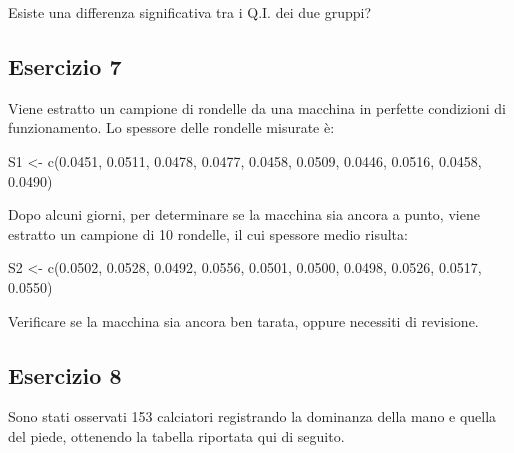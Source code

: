 \documentclass[a4paper,12pt,oneside]{book}
\newenvironment{Shaded}{\begin{snugshade}}{\end{snugshade}}
\newcommand{\FloatTok}[1]{#1}
\newcommand{\OtherTok}[1]{#1}
\newcommand{\FunctionTok}[1]{#1}
\newcommand{\NormalTok}[1]{#1}
\begin{document}
Esiste una differenza significativa tra i Q.I. dei due gruppi?

\hypertarget{esercizio-7-1}{%
\subsection{Esercizio 7}\label{esercizio-7-1}}

Viene estratto un campione di rondelle da una macchina in perfette condizioni di funzionamento. Lo spessore delle rondelle misurate è:

\begin{Shaded}
\begin{Highlighting}[]
\NormalTok{S1 }\OtherTok{\textless{}{-}} \FunctionTok{c}\NormalTok{(}\FloatTok{0.0451}\NormalTok{, }\FloatTok{0.0511}\NormalTok{, }\FloatTok{0.0478}\NormalTok{, }\FloatTok{0.0477}\NormalTok{, }\FloatTok{0.0458}\NormalTok{, }\FloatTok{0.0509}\NormalTok{, }\FloatTok{0.0446}\NormalTok{,}
        \FloatTok{0.0516}\NormalTok{, }\FloatTok{0.0458}\NormalTok{, }\FloatTok{0.0490}\NormalTok{)}
\end{Highlighting}
\end{Shaded}

Dopo alcuni giorni, per determinare se la macchina sia ancora a punto, viene estratto un campione di 10 rondelle, il cui spessore medio risulta:

\begin{Shaded}
\begin{Highlighting}[]
\NormalTok{S2 }\OtherTok{\textless{}{-}} \FunctionTok{c}\NormalTok{(}\FloatTok{0.0502}\NormalTok{, }\FloatTok{0.0528}\NormalTok{, }\FloatTok{0.0492}\NormalTok{, }\FloatTok{0.0556}\NormalTok{, }\FloatTok{0.0501}\NormalTok{, }\FloatTok{0.0500}\NormalTok{, }\FloatTok{0.0498}\NormalTok{,}
        \FloatTok{0.0526}\NormalTok{, }\FloatTok{0.0517}\NormalTok{, }\FloatTok{0.0550}\NormalTok{)}
\end{Highlighting}
\end{Shaded}

Verificare se la macchina sia ancora ben tarata, oppure necessiti di revisione.

\hypertarget{esercizio-8-1}{%
\subsection{Esercizio 8}\label{esercizio-8-1}}

Sono stati osservati 153 calciatori registrando la dominanza della mano e quella del piede, ottenendo la tabella riportata qui di seguito.
\end{document}
